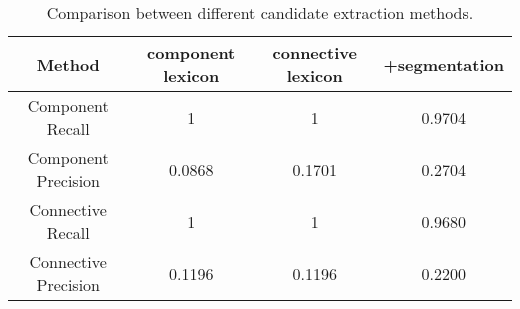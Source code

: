 \begin{table}[ht]
\centering
\begin{tabular}{|c|c|c|c|}
\hline
Method                  & component lexicon & connective lexicon & +segmentation \\ \hline

Component Recall        & 1                 & 1                  & 0.9704        \\ \hline
Component Precision     & 0.0868            & 0.1701             & 0.2704        \\

Connective Recall       & 1                 & 1                  & 0.9680        \\ \hline
Connective Precision    & 0.1196            & 0.1196             & 0.2200        \\ \hline

\end{tabular}
\caption{\label{t:cand-extract} Comparison between different candidate extraction methods. }
\end{table}
